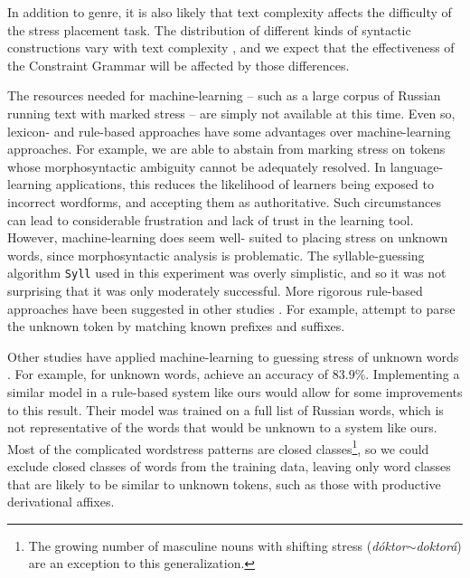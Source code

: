 \documentclass[11pt]{article}
\begin{document}
In addition to genre, it is also likely that text
complexity affects the difficulty of the stress placement task. The distribution
of different kinds of syntactic constructions vary with text complexity 
\cite{Vajjala.Meurers-12}, and
we expect that the effectiveness of the Constraint Grammar will be affected by
those differences.

The resources needed for machine-learning --
such as a large corpus of Russian running text with marked stress -- are simply
not available at this time. Even so, lexicon- and rule-based approaches have
some advantages over machine-learning approaches. For example, we are able to
abstain from marking stress on tokens whose morphosyntactic ambiguity cannot be
adequately resolved. In language-learning applications, this reduces the 
likelihood of learners being exposed to incorrect wordforms, and accepting them
as authoritative. Such circumstances can lead to considerable frustration and
lack of trust in the learning tool. However, machine-learning does seem well-
suited to
placing stress on unknown words, since morphosyntactic analysis is problematic.
The syllable-guessing algorithm {\small {\tt Syll}} used in this experiment was 
overly simplistic, and so it was not surprising that it was only moderately 
successful. More rigorous rule-based approaches have been suggested in other 
studies \cite{Church-85,Williams-87,Xomicevic_2008}. For example, 
 attempt to parse the unknown token by matching known 
prefixes and suffixes.

Other studies have applied machine-learning to guessing stress of unknown words
\cite{Pearson.ea-00,Webster-04,Dou.ea-09,hall_sproat_russian_2013}. For example,
for unknown words,  achieve an accuracy of 
83.9\%. Implementing a similar model in a rule-based system like ours would allow 
for some improvements to this result. Their model was trained on a full list of 
Russian words, which is not representative of the words that would be unknown to 
a system like ours. Most of the complicated wordstress patterns are closed 
classes\footnote{The growing number of masculine nouns with shifting stress 
(\emph{d\'{o}ktor$\sim$doktor\'{a}}) are an exception to this generalization.},
so we could exclude closed classes of words from the training data, leaving only
word classes that are likely to be similar to unknown tokens, such as those with 
productive derivational affixes.
\end{document}
